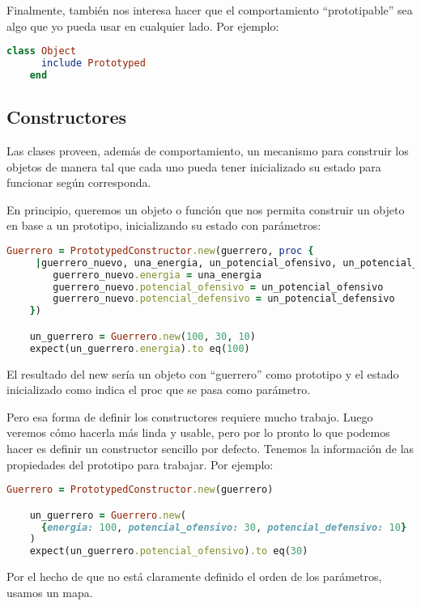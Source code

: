 \documentclass[spanish,a4paper]{article}
\begin{document}
  Finalmente, también nos interesa hacer que el comportamiento “prototipable” sea algo que yo pueda usar en cualquier lado. Por ejemplo:
 \begin{lstlisting}[language=Ruby]
	class Object
	  include Prototyped
	end
  \end{lstlisting}
\subsection{Constructores}
Las clases proveen, además de comportamiento, un mecanismo para construir los objetos de manera tal que cada uno pueda tener inicializado su estado para funcionar según corresponda.

\bigskip

En principio, queremos un objeto o función que nos permita construir un objeto en base a un prototipo, inicializando su estado con parámetros:

\begin{lstlisting}[language=Ruby]
	Guerrero = PrototypedConstructor.new(guerrero, proc {
	 |guerrero_nuevo, una_energia, un_potencial_ofensivo, un_potencial_defensivo|
		guerrero_nuevo.energia = una_energia
		guerrero_nuevo.potencial_ofensivo = un_potencial_ofensivo
		guerrero_nuevo.potencial_defensivo = un_potencial_defensivo
	})                                                          

	un_guerrero = Guerrero.new(100, 30, 10)
	expect(un_guerrero.energia).to eq(100)
\end{lstlisting}
  
  El resultado del new sería un objeto con “guerrero” como prototipo y el estado inicializado como indica el proc que se pasa como parámetro.

\bigskip

Pero esa forma de definir los constructores requiere mucho trabajo. Luego veremos cómo hacerla más linda y usable, pero por lo pronto lo que podemos hacer es definir un constructor sencillo por defecto. Tenemos la información de las propiedades del prototipo para trabajar. Por ejemplo:


\begin{lstlisting}[language=Ruby]
	Guerrero = PrototypedConstructor.new(guerrero)

	un_guerrero = Guerrero.new(
	  {energia: 100, potencial_ofensivo: 30, potencial_defensivo: 10}
	)
	expect(un_guerrero.potencial_ofensivo).to eq(30)
\end{lstlisting}

Por el hecho de que no está claramente definido el orden de los parámetros, usamos un mapa.
\end{document}
